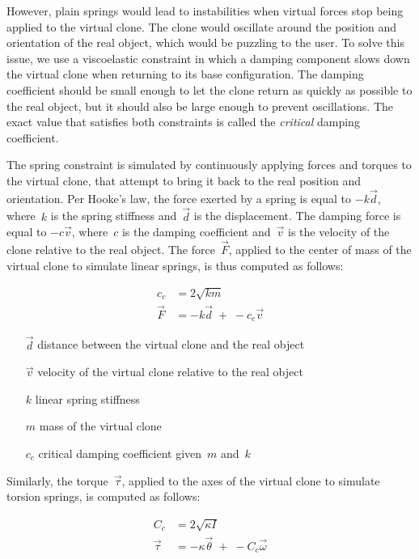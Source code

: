 \documentclass{vgtc}
\begin{document}
However, plain springs would lead to instabilities when virtual forces stop being applied to the virtual clone. The clone would oscillate around the position and orientation of the real object, which would be puzzling to the user. To solve this issue, we use a \mbox{viscoelastic} constraint in which a damping component slows down the virtual clone when returning to its base configuration. The damping coefficient should be small enough to let the clone return as quickly as possible to the real object, but it should also be large enough to prevent oscillations. The exact value that satisfies both constraints is called the \emph{critical} damping coefficient.

The spring constraint is simulated by continuously applying forces and torques to the virtual clone, that attempt to bring it back to the real position and orientation. Per Hooke's law, the force exerted by a spring is equal to $-k\vec{d}$, where~$k$ is the spring stiffness and~$\vec{d}$ is the displacement. The damping force is equal to $-c\vec{v}$, where~$c$ is the damping coefficient and~$\vec{v}$ is the velocity of the clone relative to the real object. The force~$\vec{F}$, applied to the center of mass of the virtual clone to simulate linear springs, is thus computed as follows:

\vspace{-3mm}
\begin{align*}
  c_c &= 2\sqrt{k m}\\
  \vec{F} &= -k\vec{d} \;+\; -c_c\vec{v}
\end{align*}

\vspace{-3mm}
\begin{itemize}[leftmargin=1.5em]
\item[$\vec{d}$] distance between the virtual clone and the real object
\item[$\vec{v}$] velocity of the virtual clone relative to the real object
\item[$k$] linear spring stiffness
\item[$m$] mass of the virtual clone
\item[$c_c$] critical damping coefficient given~$m$ and~$k$
\end{itemize}

Similarly, the torque~$\vec{\tau}$, applied to the axes of the virtual clone to simulate torsion springs, is computed as follows:

\vspace{-3mm}
\begin{align*}
  C_c &= 2\sqrt{\kappa I}\\
  \vec{\tau} &= -\kappa\vec{\theta} \;+\; -C_c\vec{\omega}
\end{align*}
\end{document}
